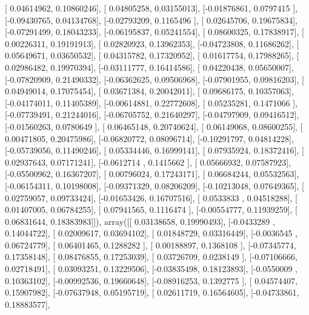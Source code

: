 \documentclass{article}
\begin{document}
       [ 0.04614962,  0.10860246],
       [ 0.04805258,  0.03155013],
       [-0.01876861,  0.0797415 ],
       [-0.09430765,  0.04134768],
       [-0.02793209,  0.1165496 ],
       [ 0.02645706,  0.19675834],
       [-0.07291499,  0.18043233],
       [-0.06195837,  0.05241554],
       [ 0.08600325,  0.17838917],
       [ 0.00226311,  0.19191913],
       [ 0.02820923,  0.13962353],
       [-0.04723808,  0.11686262],
       [ 0.05649671,  0.03650532],
       [ 0.04315782,  0.17320952],
       [ 0.01617754,  0.17988265],
       [ 0.02986482,  0.19970394],
       [-0.03111777,  0.16414586],
       [ 0.04220438,  0.05650007],
       [-0.07820909,  0.21490332],
       [-0.06362625,  0.09506968],
       [-0.07901955,  0.09816203],
       [ 0.04949014,  0.17075454],
       [ 0.03671384,  0.20042011],
       [ 0.09686175,  0.10357063],
       [-0.04174011,  0.11405389],
       [-0.00614881,  0.22772608],
       [ 0.05235281,  0.1471066 ],
       [-0.07739491,  0.21244016],
       [-0.06705752,  0.21640297],
       [-0.04797909,  0.09416512],
       [-0.01560263,  0.0780649 ],
       [ 0.06465148,  0.20740624],
       [ 0.06149068,  0.08600255],
       [ 0.00471805,  0.20475986],
       [-0.06820772,  0.08096714],
       [-0.10291797,  0.04814228],
       [-0.05739056,  0.11490246],
       [ 0.05334446,  0.16999141],
       [ 0.07935924,  0.18372416],
       [ 0.02937643,  0.07171241],
       [-0.0612714 ,  0.1415662 ],
       [ 0.05666932,  0.07587923],
       [-0.05500962,  0.16367207],
       [ 0.00796024,  0.17243171],
       [ 0.06684244,  0.05532563],
       [-0.06154311,  0.10198008],
       [-0.09371329,  0.08206209],
       [-0.10213048,  0.07649365],
       [ 0.02759057,  0.09733424],
       [-0.01653426,  0.16707516],
       [ 0.0533833 ,  0.04518288],
       [ 0.01407005,  0.06784255],
       [ 0.07941565,  0.1116474 ],
       [-0.00554777,  0.11939259],
       [ 0.06831644,  0.18383983]]), array([[ 0.03138658,  0.19990493],
       [-0.0433289 ,  0.14044722],
       [ 0.02009617,  0.03694102],
       [ 0.01848729,  0.03316449],
       [-0.0036545 ,  0.06724779],
       [ 0.06401465,  0.1288282 ],
       [ 0.00188897,  0.1368108 ],
       [-0.07345774,  0.17358148],
       [ 0.08476855,  0.17253039],
       [ 0.03726709,  0.0238149 ],
       [-0.07106666,  0.02718491],
       [ 0.03093251,  0.13229506],
       [-0.03835498,  0.18123893],
       [-0.0550009 ,  0.10363102],
       [-0.00992536,  0.19660648],
       [-0.08916253,  0.1392775 ],
       [ 0.04574407,  0.15907982],
       [-0.07637948,  0.05195719],
       [ 0.02611719,  0.16564605],
       [-0.04733861,  0.18883577],
\end{document}
